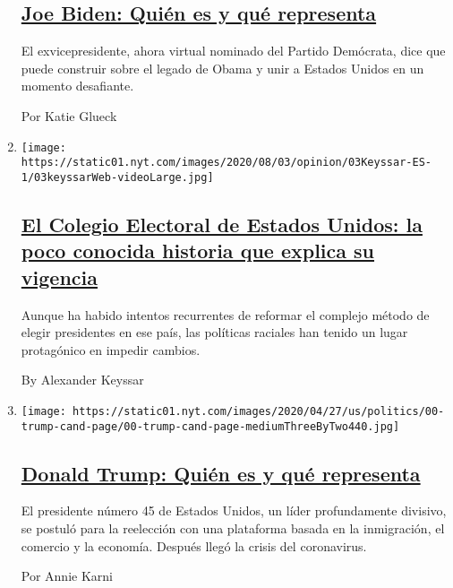 \begin{enumerate}
  \hypertarget{joe-biden-quiuxe9n-es-y-quuxe9-representa}{%
  \subsection{\texorpdfstring{\href{/es/interactive/2020/espanol/estados-unidos/joe-biden-elecciones.html}{Joe
  Biden: Quién es y qué
  representa}}{Joe Biden: Quién es y qué representa}}\label{joe-biden-quiuxe9n-es-y-quuxe9-representa}}

  El exvicepresidente, ahora virtual nominado del Partido Demócrata,
  dice que puede construir sobre el legado de Obama y unir a Estados
  Unidos en un momento desafiante.

  Por Katie Glueck
\item
  \texttt{[image: https://static01.nyt.com/images/2020/08/03/opinion/03Keyssar-ES-1/03keyssarWeb-videoLarge.jpg]}

  \hypertarget{el-colegio-electoral-de-estados-unidos-la-poco-conocida-historia-que-explica-su-vigencia}{%
  \subsection{\texorpdfstring{\href{/es/2020/08/03/espanol/opinion/colegio-electoral-estados-unidos.html}{El
  Colegio Electoral de Estados Unidos: la poco conocida historia que
  explica su
  vigencia}}{El Colegio Electoral de Estados Unidos: la poco conocida historia que explica su vigencia}}\label{el-colegio-electoral-de-estados-unidos-la-poco-conocida-historia-que-explica-su-vigencia}}

  Aunque ha habido intentos recurrentes de reformar el complejo método
  de elegir presidentes en ese país, las políticas raciales han tenido
  un lugar protagónico en impedir cambios.

  By Alexander Keyssar
\item
  \texttt{[image: https://static01.nyt.com/images/2020/04/27/us/politics/00-trump-cand-page/00-trump-cand-page-mediumThreeByTwo440.jpg]}

  \hypertarget{donald-trump-quiuxe9n-es-y-quuxe9-representa}{%
  \subsection{\texorpdfstring{\href{/es/interactive/2020/espanol/estados-unidos/donald-trump-elecciones.html}{Donald
  Trump: Quién es y qué
  representa}}{Donald Trump: Quién es y qué representa}}\label{donald-trump-quiuxe9n-es-y-quuxe9-representa}}

  El presidente número 45 de Estados Unidos, un líder profundamente
  divisivo, se postuló para la reelección con una plataforma basada en
  la inmigración, el comercio y la economía. Después llegó la crisis del
  coronavirus.

  Por Annie Karni
\end{enumerate}

